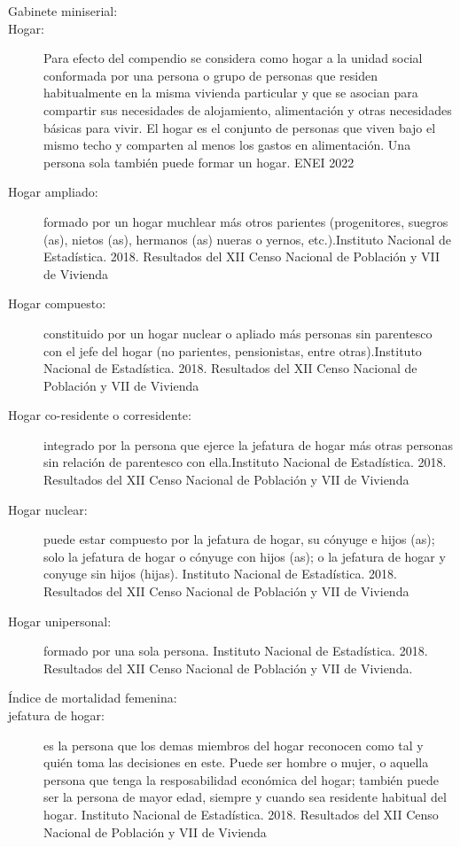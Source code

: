 \begin{description}
	\item[Gabinete miniserial:]
	\item[Hogar:] Para efecto del compendio se considera como hogar a la unidad social conformada por una persona o grupo de personas que residen habitualmente en la misma vivienda particular y que se asocian para compartir sus necesidades de alojamiento, alimentación y otras necesidades básicas para vivir. El hogar es el conjunto de personas que viven bajo el mismo techo y comparten al menos los gastos en alimentación. Una persona sola también puede formar un hogar. ENEI 2022
	\item[Hogar ampliado:] formado por un hogar muchlear más otros parientes (progenitores, suegros (as), nietos (as), hermanos (as) nueras o yernos, etc.).Instituto Nacional de Estadística. 2018. Resultados del XII Censo Nacional de Población y VII de Vivienda
	\item[Hogar compuesto:] constituido por un hogar nuclear o apliado más personas sin parentesco con el jefe del hogar (no parientes, pensionistas, entre otras).Instituto Nacional de Estadística. 2018. Resultados del XII Censo Nacional de Población y VII de Vivienda
     	\item[Hogar co-residente o corresidente:] integrado por la persona que ejerce la jefatura de hogar más otras personas sin relación de parentesco con ella.Instituto Nacional de Estadística. 2018. Resultados del XII Censo Nacional de Población y VII de Vivienda
        \item[Hogar nuclear:] puede estar compuesto por la jefatura de hogar, su cónyuge e hijos (as); solo la jefatura de hogar o cónyuge con hijos (as); o la jefatura de hogar y conyuge sin hijos (hijas). Instituto Nacional de Estadística. 2018. Resultados del XII Censo Nacional de Población y VII de Vivienda
	\item[Hogar unipersonal:] formado por una sola persona. Instituto Nacional de Estadística. 2018. Resultados del XII Censo Nacional de Población y VII de Vivienda.
	\item[Índice de mortalidad femenina:] 
	\item[jefatura de hogar:] es la persona que los demas miembros del hogar reconocen como tal y quién toma las decisiones en este. Puede ser hombre o mujer, o aquella persona que tenga la resposabilidad económica del hogar; también puede ser la persona de mayor edad, siempre y cuando sea residente habitual del hogar. Instituto Nacional de Estadística. 2018. Resultados del XII Censo Nacional de Población y VII de Vivienda

\end{description}
